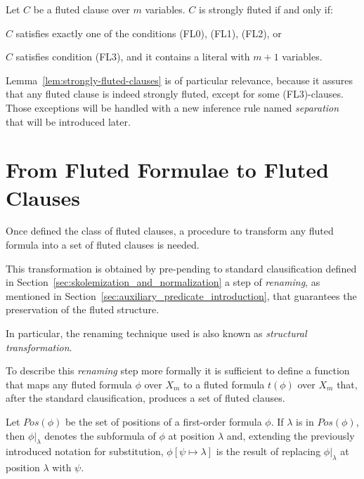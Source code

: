 \begin{lemma}\label{lem:strongly-fluted-clauses}
  Let \(C\) be a fluted clause over \(m\) variables. \(C\) is strongly fluted if and only if:
  \begin{enumerate*}[label= (\roman*)]
    \item \(C\) satisfies exactly one of the conditions (FL0), (FL1), (FL2), or
    \item \(C\) satisfies condition (FL3), and it contains a literal with \(m+1\) variables.
  \end{enumerate*}
\end{lemma}

Lemma~\ref{lem:strongly-fluted-clauses} is of particular relevance, because it assures that any fluted clause is indeed strongly fluted, except for some (FL3)-clauses. Those exceptions will be handled with a new inference rule named \emph{separation} that will be introduced later.

\section{From Fluted Formulae to Fluted Clauses}\label{sec:from-fluted-formulae-to-fluted-clauses}

Once defined the class of fluted clauses, a procedure to transform any fluted formula into a set of fluted clauses is needed.

This transformation is obtained by pre-pending to standard clausification defined in Section~\ref{sec:skolemization_and_normalization} a step of \emph{renaming}, as mentioned in Section~\ref{sec:auxiliary_predicate_introduction}, that guarantees the preservation of the fluted structure.

In particular, the renaming technique used is also known as \emph{structural transformation}.

To describe this \emph{renaming} step more formally it is sufficient to define a function that maps any fluted formula \(\phi\) over \(X_m\) to a fluted formula \(t(\phi)\) over \(X_m\) that, after the standard clausification, produces a set of fluted clauses.

Let \(Pos(\phi)\) be the set of positions of a first-order formula \(\phi\). If \(\lambda\) is in \(Pos(\phi)\), then \(\phi|_\lambda\) denotes the subformula of \(\phi\) at position \(\lambda\) and, extending the previously introduced notation for substitution, \(\phi[\psi\mapsto\lambda]\) is the result of replacing \(\phi|_\lambda\)  at position \(\lambda\) with \(\psi\).


